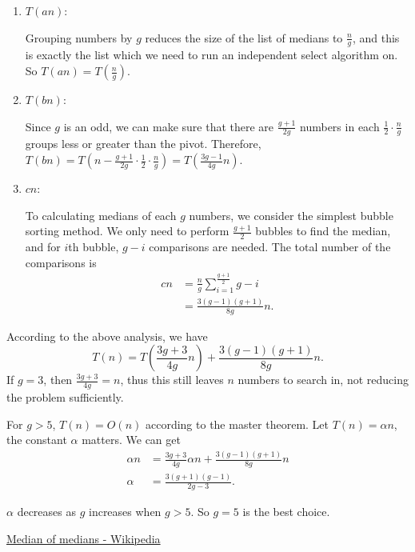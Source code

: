 \documentclass{oxmathproblems}
\begin{document}
\begin{questions}
\begin{Solution}
\begin{enumerate}
    \item $T(an)$:

    Grouping numbers by $g$ reduces the size of the list of medians to $\frac{n}{g}$, and this is exactly the list which we need to run an independent select algorithm on. So $T(an)=T(\frac{n}{g})$.

    \item $T(bn)$:

    Since $g$ is an odd, we can make sure that there are $\frac{g+1}{2g}$ numbers in each $\frac{1}{2}\cdot\frac{n}{g}$ groups less or greater than the pivot. Therefore, $T(bn)=T(n-\frac{g+1}{2g}\cdot\frac{1}{2}\cdot\frac{n}{g})=T(\frac{3g-1}{4g}n)$.

    \item $cn$:

    To calculating medians of each $g$ numbers, we consider the simplest bubble sorting method. We only need to perform $\frac{g+1}{2}$ bubbles to find the median, and for $i$th bubble, $g-i$ comparisons are needed. The total number of the comparisons is\begin{align*}
        cn&=\frac{n}{g}\sum_{i=1}^{\frac{g+1}{2}}g-i \\
        &=\frac{3(g-1)(g+1)}{8g}n.
    \end{align*}
\end{enumerate}

According to the above analysis, we have $$T(n)=T(\frac{3g+3}{4g}n)+\frac{3(g-1)(g+1)}{8g}n.$$ If $g=3$, then $\frac{3g+3}{4g}=n$, thus this still leaves $n$ numbers to search in, not reducing the problem sufficiently. 

For $g>5$, $T(n)=O(n)$ according to the master theorem. Let $T(n)=\alpha n$, the constant $\alpha$ matters. We can get \begin{align*}
    \alpha n &= \frac{3g+3}{4g}\alpha n + \frac{3(g-1)(g+1)}{8g}n \\
    \alpha &= \frac{3(g+1)(g-1)}{2g-3}.
\end{align*}

$\alpha$ decreases as $g$ increases when $g>5$. So $g=5$ is the best choice.

\begin{Reference}

\href{https://en.wikipedia.org/wiki/Median_of_medians}{Median of medians - Wikipedia}

\end{Reference}
\end{Solution}




\end{questions}
\end{document}
